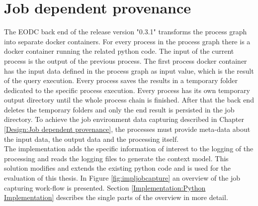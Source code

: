 \documentclass[draft,final]{vutinfth} %
\begin{document}
\section{Job dependent provenance}\label{Implementation:Job dependent provenance}
The EODC back end of the release version "0.3.1" transforms the process graph into separate docker containers. For every process in the process graph there is a docker container running the related python code. The input of the current process is the output of the previous process. The first process docker container has the input data defined in the process graph as input value, which is the result of the query execution. Every process saves the results in a temporary folder dedicated to the specific process execution. Every process has its own temporary output directory until the whole process chain is finished. After that the back end deletes the temporary folders and only the end result is persisted in the job directory.
To achieve the job environment data capturing described in Chapter \ref{Design:Job dependent provenance}, the processes must provide meta-data about the input data, the output data and the processing itself. \\ 
The implementation adds the specific information of interest to the logging of the processing and reads the logging files to generate the context model. This solution modifies and extends the existing python code and is used for the evaluation of this thesis. In Figure \ref{fig:impljobcapture} an overview of the job capturing work-flow is presented. Section \ref{Implementation:Python Implementation} describes the single parts of the overview in more detail.  
\end{document}
